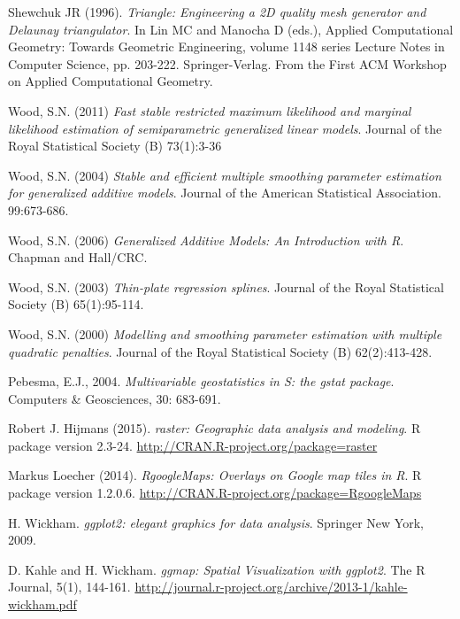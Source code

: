 \documentclass[a4paper,11pt,twoside,openright]{book}							%
\begin{document}
\begin{thebibliography}{99}
Shewchuk JR (1996). \emph{Triangle: Engineering a 2D quality mesh generator and Delaunay triangulator}. In Lin MC and Manocha D (eds.), Applied Computational Geometry: Towards Geometric Engineering, volume 1148 series Lecture Notes in Computer Science, pp. 203-222. Springer-Verlag. From the First ACM Workshop on Applied Computational Geometry.

Wood, S.N. (2011) \emph{Fast stable restricted maximum likelihood and marginal likelihood estimation of semiparametric generalized linear models}. Journal of the Royal Statistical Society (B) 73(1):3-36

Wood, S.N. (2004) \emph{Stable and efficient multiple smoothing parameter estimation for generalized additive models}. Journal of the American Statistical Association. 99:673-686.

Wood, S.N. (2006) \emph{Generalized Additive Models: An Introduction with R}. Chapman and Hall/CRC.

Wood, S.N. (2003) \emph{Thin-plate regression splines}. Journal of the Royal Statistical Society (B) 65(1):95-114.
  
Wood, S.N. (2000) \emph{Modelling and smoothing parameter estimation with multiple quadratic penalties}. Journal of the Royal Statistical Society (B) 62(2):413-428.

Pebesma, E.J., 2004. \emph{Multivariable geostatistics in S: the gstat package}. Computers \& Geosciences, 30: 683-691.

Robert J. Hijmans (2015). \emph{raster: Geographic data analysis and modeling}. R package version 2.3-24. \href{http://CRAN.R-project.org/package=raster}{http://CRAN.R-project.org/package=raster}

Markus Loecher (2014). \emph{RgoogleMaps: Overlays on Google map tiles in R}. R package version 1.2.0.6. \href{http://CRAN.R-project.org/package=RgoogleMaps}{http://CRAN.R-project.org/package=RgoogleMaps}

H. Wickham. \emph{ggplot2: elegant graphics for data analysis}. Springer New York, 2009.

D. Kahle and H. Wickham. \emph{ggmap: Spatial Visualization with ggplot2}. The R Journal, 5(1), 144-161. \href{http://journal.r-project.org/archive/2013-1/kahle-wickham.pdf}{http://journal.r-project.org/archive/2013-1/kahle-wickham.pdf}

\end{thebibliography}
\end{document}

